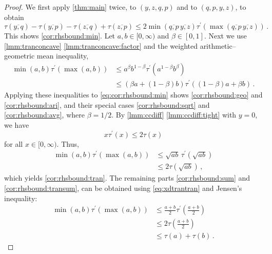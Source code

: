\documentclass{article}
\newcommand{\lb}{\left(} %
\newcommand{\rb}{\right)} %
\newcommand{\br}[1]{\lb #1 \rb} %
\newcommand{\brOf}[1]{\!\br{#1}} %
\newcommand{\Rp}{[0, \infty)} %
\newcommand{\pr}{^\prime}
\newcommand{\equationFullstop}{\, .}
\newcommand{\eqfs}{\equationFullstop}
\newcommand{\equationComma}{\, ,}
\newcommand{\eqcm}{\equationComma}
\newcommand{\ol}[2]{\overline{#1,#2}}
\newcommand{\tran}{\tau}
\newcommand{\dtran}{\tran\pr}
\begin{document}
%
\begin{proof}
	We first apply \cref{thm:main} twice, to $(y,z,q,p)$ and  to $(q,p,y,z)$, to obtain
	\begin{equation}\label{eq:cor:rhsbound:min}
		\tran(\ol yq) - \tran(\ol yp) - \tran(\ol zq) + \tran(\ol zp) \leq 2 \min(\ol qp\, \ol yz) \dtran\brOf{\max(\ol qp\, \ol yz)}
		\eqfs
	\end{equation}
	This shows \ref{cor:rhsbound:min}.
	Let $a,b\in\Rp$ and $\beta\in [0,1]$. Next we use \cref{lmm:tranconcave} \ref{lmm:tranconcave:factor} and the weighted arithmetic--geometric mean inequality, 
	\begin{align*}
		\min(a,b) \dtran(\max(a,b)) 
		&\leq 
		a^\beta b^{1-\beta} \dtran(a^{1-\beta} b^\beta)
		\\&\leq 
		\br{\beta a + (1-\beta)b} \dtran((1-\beta)a + \beta b)
		\eqfs
	\end{align*}
	Applying these inequalities to \eqref{eq:cor:rhsbound:min} shows \ref{cor:rhsbound:geo} and \ref{cor:rhsbound:ari}, and their special cases \ref{cor:rhsbound:sqrt} and \ref{cor:rhsbound:avg}, where $\beta=1/2$.
	By \cref{lmm:ccdiff} \ref{lmm:ccdiff:tight} with $y=0$, we have 
	\begin{equation}\label{eq:xdtrantran}
		x\dtran(x) \leq 2 \tran(x)
	\end{equation}
	for all $x\in\Rp$. Thus,
	\begin{align*}
		\min(a,b) \dtran(\max(a,b)) 
		&\leq 
		\sqrt{a b} \,\dtran(\sqrt{a b})
		\\&\leq 
		2\tran(\sqrt{a b})
		\eqcm
	\end{align*}
	which yields \ref{cor:rhsbound:tran}. The remaining parts \ref{cor:rhsbound:sum} and \ref{cor:rhsbound:transum}, can be obtained using \eqref{eq:xdtrantran} and Jensen's inequality:
	\begin{align*}
		\min(a,b) \dtran(\max(a,b)) 
		&\leq 
		\frac{a+b}2 \dtran\brOf{\frac{a+b}2}
		\\&\leq 
		2\tran\brOf{\frac{a+b}2}
		\\&\leq 
		\tran(a) + \tran(b)
		\eqfs
	\end{align*}
\end{proof}
%
%
%
\end{document}
